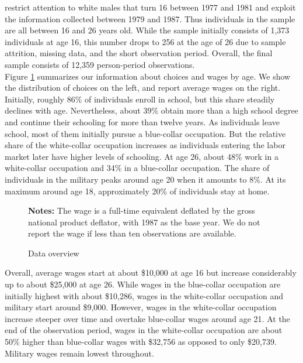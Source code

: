 \noindent \citet{Keane.1997} restrict attention to white males that turn 16 between 1977 and 1981 and exploit the information collected between 1979 and 1987. Thus individuals in the sample are all between 16 and 26 years old. While the sample initially consists of 1,373 individuals at age 16, this number drops to 256 at the age of 26 due to sample attrition, missing data, and the short observation period. Overall, the final sample consists of 12,359 person-period observations.\\

\noindent Figure \ref{Overview} summarizes our information about choices and wages by age. We show the distribution of choices on the left, and report average wages on the right. Initially, roughly 86\% of individuals enroll in school, but this share steadily declines with age. Nevertheless, about 39\% obtain more than a high school degree and continue their schooling for more than twelve years. As individuals leave school, most of them initially pursue a blue-collar occupation. But the relative share of the white-collar occupation increases as individuals entering the labor market later have higher levels of schooling. At age 26, about 48\% work in a white-collar occupation and 34\% in a blue-collar occupation. The share of individuals in the military peaks around age 20 when it amounts to 8\%. At its maximum around age 18, approximately 20\% of individuals stay at home.
%
\begin{figure}[h!]\centering
\caption{Data overview}\label{Overview}
\hspace{0.3cm}
\begin{center}
\begin{minipage}[t]{0.75\columnwidth}
\item \scriptsize{\textbf{Notes:} The wage is a full-time equivalent deflated by the gross national product deflator, with 1987 as the base year. We do not report the wage if less than ten observations are available.}
\end{minipage}
\end{center}
\end{figure}\FloatBarrier
%
\noindent Overall, average wages start at about \$10,000 at age 16 but increase considerably up to about \$25,000 at age 26. While wages in the blue-collar occupation are initially highest with about \$10,286, wages in the white-collar occupation and military start around \$9,000. However, wages in the white-collar occupation increase steeper over time and overtake blue-collar wages around age 21. At the end of the observation period, wages in the white-collar occupation are about 50\% higher than blue-collar wages with \$32,756 as opposed to only \$20,739. Military wages remain lowest throughout.\\

